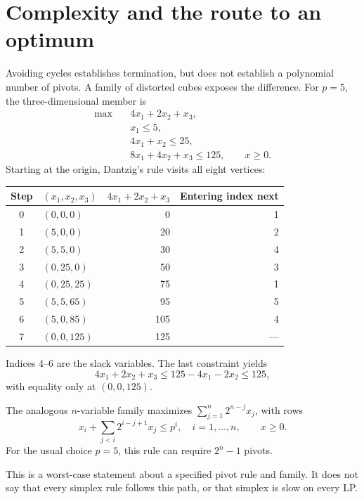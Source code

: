\documentclass[11pt,a4paper]{article}
\begin{document}
\section{Complexity and the route to an optimum}\label{sec:complexity}
Avoiding cycles establishes termination, but does not establish a polynomial
number of pivots. A family of distorted cubes exposes the difference.
For $p=5$, the three-dimensional member is
\[
  \begin{aligned}
    \max\quad &4x_1+2x_2+x_3,\\
    &x_1\leq5,\\
    &4x_1+x_2\leq25,\\
    &8x_1+4x_2+x_3\leq125,\qquad x\geq0.
  \end{aligned}
\]
Starting at the origin, Dantzig's rule visits all eight vertices:
\begin{center}
  \begin{tabular}{clrr}\toprule
    Step & $(x_1,x_2,x_3)$ & $4x_1+2x_2+x_3$ & Entering index next\\\midrule
    0 & $(0,0,0)$ & 0 & 1\\
    1 & $(5,0,0)$ & 20 & 2\\
    2 & $(5,5,0)$ & 30 & 4\\
    3 & $(0,25,0)$ & 50 & 3\\
    4 & $(0,25,25)$ & 75 & 1\\
    5 & $(5,5,65)$ & 95 & 5\\
    6 & $(5,0,85)$ & 105 & 4\\
    7 & $(0,0,125)$ & 125 & ---\\\bottomrule
  \end{tabular}
\end{center}
Indices 4--6 are the slack variables. The last constraint yields
\[
  4x_1+2x_2+x_3\leq125-4x_1-2x_2\leq125,
\]
with equality only at $(0,0,125)$.
\begin{lecturecore}
  The analogous $n$-variable family maximizes
  $\sum_{j=1}^n2^{n-j}x_j$, with rows
  \[
    x_i+\sum_{j<i}2^{i-j+1}x_j\leq p^i,\quad i=1,\ldots,n,
    \qquad x\geq0.
  \]
  For the usual choice $p=5$, this rule can require $2^n-1$ pivots. \end{lecturecore}
This is a
worst-case statement about a specified pivot rule and family. It does not say
that every simplex rule follows this path, or that simplex is slow on every LP.
\end{document}
